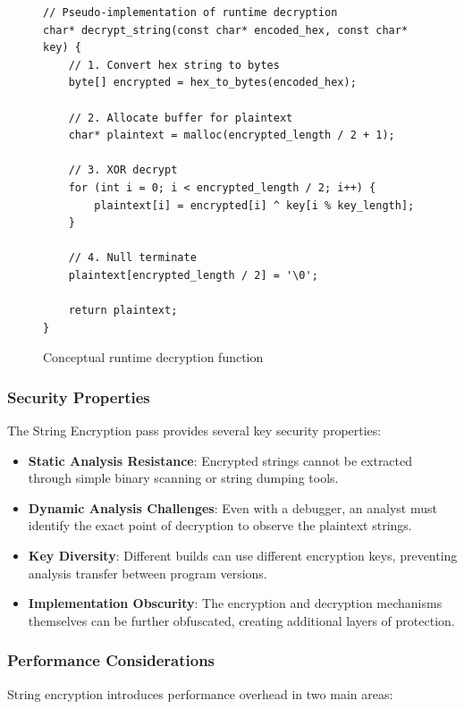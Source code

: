 \documentclass[conference]{IEEEtran}
\begin{document}
\begin{figure}[ht!]
\centering
\begin{minipage}{0.5\textwidth}
\begin{lstlisting}[style=pseudocode,basicstyle=\footnotesize]
// Pseudo-implementation of runtime decryption
char* decrypt_string(const char* encoded_hex, const char* key) {
    // 1. Convert hex string to bytes
    byte[] encrypted = hex_to_bytes(encoded_hex);
    
    // 2. Allocate buffer for plaintext
    char* plaintext = malloc(encrypted_length / 2 + 1);
    
    // 3. XOR decrypt
    for (int i = 0; i < encrypted_length / 2; i++) {
        plaintext[i] = encrypted[i] ^ key[i % key_length];
    }
    
    // 4. Null terminate
    plaintext[encrypted_length / 2] = '\0';
    
    return plaintext;
}
\end{lstlisting}
\end{minipage}
\caption{Conceptual runtime decryption function}
\end{figure}

\subsubsection{Security Properties}
The String Encryption pass provides several key security properties:

\begin{itemize}
    \item \textbf{Static Analysis Resistance}: Encrypted strings cannot be extracted through simple binary scanning or string dumping tools.
    
    \item \textbf{Dynamic Analysis Challenges}: Even with a debugger, an analyst must identify the exact point of decryption to observe the plaintext strings.
    
    \item \textbf{Key Diversity}: Different builds can use different encryption keys, preventing analysis transfer between program versions.
    
    \item \textbf{Implementation Obscurity}: The encryption and decryption mechanisms themselves can be further obfuscated, creating additional layers of protection.
\end{itemize}

\subsubsection{Performance Considerations}
String encryption introduces performance overhead in two main areas:
\end{document}
